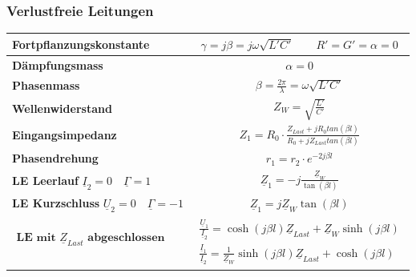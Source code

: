 	\subsubsection{Verlustfreie Leitungen}
		\renewcommand{\arraystretch}{1.5}
		\begin{tabular}{| l | c |}
			\hline
				\textbf{Fortpflanzungskonstante}
				& $\gamma=j\beta=j\omega \sqrt{L'C'} \qquad R'=G'=\alpha=0$\\
			\hline
				\textbf{Dämpfungsmass}
				& $\alpha=0$\\
			\hline
				\textbf{Phasenmass}
				& $\beta=\frac{2\pi}{\lambda}=\omega\sqrt{L'C'}$\\
			\hline
				\textbf{Wellenwiderstand}
				& $Z_W=\sqrt{\frac{L'}{C'}}$\\
			\hline
				\textbf{Eingangsimpedanz}
				& $Z_1=R_0\cdot\frac{Z_{Last}+jR_0tan(\beta l)}{R_0+jZ_{Last}tan(\beta l)}
				$\\
			\hline
				\textbf{Phasendrehung}
				& $r_1=r_2\cdot e^{-2j\beta l}$\\
			\hline
				\textbf{LE Leerlauf} $\underline{I}_2=0 \quad \underline{\Gamma}=1$
				& $\underline{Z}_1=-j\frac{\underline{Z}_W}{\tan(\beta l)}$\\
			\hline
				\textbf{LE Kurzschluss} $\underline{U}_2=0 \quad \underline{\Gamma}=-1$
				& $\underline{Z}_1=j \underline{Z}_W \tan(\beta l)$\\
			\hline
				$\begin{matrix}
					\textbf{LE mit }\underline{Z}_{Last} \textbf{ abgeschlossen}\\
				\end{matrix}$
				& $\begin{matrix}
                  	\frac{\underline{U}_1}{\underline{I}_2}=\cosh(j\beta
                  	l)\underline{Z}_{Last}+\underline{Z}_W \sinh(j\beta l)\\
                  	\frac{\underline{I}_1}{\underline{I}_2}=\frac{1}{\underline{Z}_W} \sinh(j\beta
                  	l)\underline{Z}_{Last}+ \cosh(j\beta l) \end{matrix}$\\
			\hline
		\end{tabular}
	\renewcommand{\arraystretch}{1}
	\newpage

